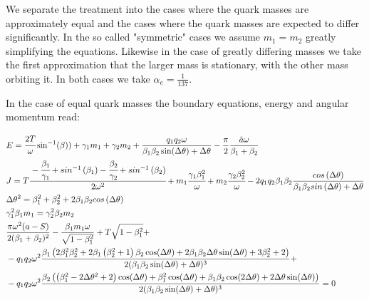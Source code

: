 \documentclass[11pt,a4paper]{article}
\begin{document}
We separate the treatment into the cases where the quark masses are approximately equal and the cases where the quark masses are expected to differ significantly. In the so called "symmetric" cases we assume $m_{1}=m_{2}$ greatly simplifying the equations. Likewise in the case of greatly differing masses we take the first approximation that the larger mass is stationary, with the other mass orbiting it. In both cases we take $\alpha_{e}=\frac{1}{137}$.

In the case of equal quark masses the boundary equations, energy and angular momentum read:

\begin{subequations}
\label{eq:regge}
\begin{align}
&E=\cfrac{2T}{\omega}\sin^{-1}(\beta))+\gamma_{1}m_{1}+\gamma_{2}m_{2}+\frac{q_{1}q_{2}\omega}{\beta_{1}\beta_{2}\sin(\Delta\theta)+\Delta\theta}-\frac{\pi}{2}\frac{\tilde{a}\omega}{\beta_{1}+\beta_{2}}\\
&J=T\cfrac{-\cfrac{\beta_{1}}{\gamma_{1}}+sin^{-1}\left(\beta_{1}\right)-\cfrac{\beta_{2}}{\gamma_{2}}+sin^{-1}\left(\beta_{2}\right)}{2\omega^{2}}+m_{1}\cfrac{\gamma_{1}\beta_{1}^{2}}{\omega}+m_{2}\cfrac{\gamma_{2}\beta_{2}^{2}}{\omega}-2q_{1}q_{2}\beta_{1}\beta_{2}\frac{cos\left(\Delta\theta\right)}{\beta_{1}\beta_{2}sin\left(\Delta\theta\right)+\Delta\theta}\\
&\Delta\theta^{2}=\beta_{1}^{2}+\beta_{2}^{2}+2\beta_{1}\beta_{2}cos\left(\Delta\theta\right)\\
&\gamma_{1}^{2}\beta_{1}m_{1}=\gamma_{2}^{2}\beta_{2}m_{2}\\
&\frac{\pi  \omega ^2 (a-S)}{2 (\beta_1+\beta_2)^2}-\frac{\beta_1 m_1 \omega }{\sqrt{1-\beta_1^2}}+T\sqrt{1-\beta_1^2}+\\
&-q_1 q_2 \omega ^2 \frac{\beta_1 \left(2 \beta_1^2 \beta_2^2+2 \beta_1 \left(\beta_2^2+1\right) \beta_2 \cos (\Delta \theta )+2 \beta_1 \beta_2 \Delta \theta  \sin (\Delta \theta )+3 \beta_2^2+2\right)}{2 (\beta_1 \beta_2 \sin (\Delta \theta )+\Delta \theta )^3}+\notag\\
&-q_1 q_2 \omega ^2\frac{\beta_2 \left(\left(\beta_1^2-2 \Delta \theta ^2+2\right) \cos (\Delta \theta )+\beta_1^2 \cos (\Delta \theta )+\beta_1 \beta_2 \cos (2 \Delta \theta )+2 \Delta \theta  \sin (\Delta \theta )\right)}{2 (\beta_1 \beta_2 \sin (\Delta \theta )+\Delta \theta )^3}=0\notag
\end{align}
\end{subequations}
\end{document}
